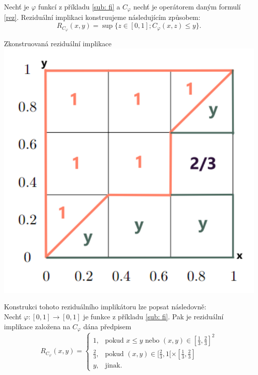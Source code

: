 \begin{example} Nech\v t je $\varphi$ funkcí z příkladu \ref{sub: fi} a $C_\varphi$ nech\v t je operátorem daným formulí \ref{rez}. Reziduální implikaci konstruujeme následujícím zp\r usobem: $$R_{C_\varphi}(x,y)=\sup\{z \in [0,1]; C_\varphi(x,z) \leq y\}.$$  
    
    \begin{graph} Zkonstruovaná reziduální implikace\\
        \centering
        \includegraphics[scale=0.8]{template-fig/RPhi-impl.pdf}
    \end{graph}
\end{example}

Konstrukci tohoto reziduálního implikátoru lze popsat následovn\v e:\\
    Nech\v t  $\varphi:[0,1]\rightarrow [0,1]$ je funkce z příkladu \ref{sub: fi}.
Pak je reziduální implikace zalo\v zena na $C_\varphi$ dána p\v redpisem
$$ R_{C_\varphi}(x,y) = \begin{cases} 1, & \mbox{pokud } x\leq y \mbox{ nebo } (x,y) \in [\frac{1}{3},\frac{2}{3}]^2\\
\frac{2}{3}, &\mbox {pokud }
(x,y)\in [\frac{2}{3},1[\times[\frac{1}{3},\frac{2}{3}]
\\ y, &\mbox {jinak.}
\end{cases} $$

